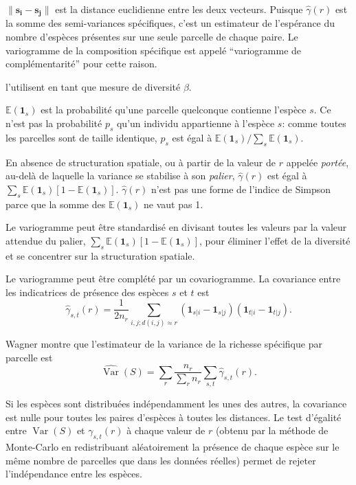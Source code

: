 \documentclass[
  11pt,
  french,
  a4paper,
  extrafontsizes,onecolumn,openright
  ]{memoir}
\begin{document}
\(\|\mathbf{s_i}-\mathbf{s_j}\|\) est la distance euclidienne entre les deux vecteurs.
Puisque \(\hat{\gamma}(r)\) est la somme des semi-variances spécifiques, c'est un estimateur de l'espérance du nombre d'espèces présentes sur une seule parcelle de chaque paire.
Le variogramme de la composition spécifique est appelé ``variogramme de complémentarité'' pour cette raison.

\textcite{Bacaro2007a} l'utilisent en tant que mesure de diversité \(\beta\).

\({\mathbb E}({\mathbf 1}_{s})\) est la probabilité qu'une parcelle quelconque contienne l'espèce \(s\).
Ce n'est pas la probabilité \(p_s\) qu'un individu appartienne à l'espèce \(s\):
comme toutes les parcelles sont de taille identique, \(p_s\) est égal à \({{\mathbb E}({\mathbf 1}_{s})}/{\sum_s{{\mathbb E}({\mathbf 1}_{s})}}\).

En absence de structuration spatiale, ou à partir de la valeur de \(r\) appelée \emph{portée}, au-delà de laquelle la variance se stabilise à son \emph{palier}, \(\hat{\gamma}(r)\) est égal à \(\sum_s{{\mathbb E}({\mathbf 1}_{s})[1-{\mathbb E}({\mathbf 1}_{s})]}\).
\(\hat{\gamma}(r)\) n'est pas une forme de l'indice de Simpson parce que la somme des \({\mathbb E}({\mathbf 1}_{s})\) ne vaut pas 1.

Le variogramme peut être standardisé en divisant toutes les valeurs par la valeur attendue du palier, \(\sum_s{{\mathbb E}({\mathbf 1}_{s})[1-{\mathbb E}({\mathbf 1}_{s})]}\), pour éliminer l'effet de la diversité et se concentrer sur la structuration spatiale.

Le variogramme peut être complété par un covariogramme.
La covariance entre les indicatrices de présence des espèces \(s\) et \(t\) est
\begin{equation}
  \label{eq:Estgammast}
  \hat{\gamma}_{s,t}(r) = \frac{1}{2 n_r} \sum_{i,j;d(i,j)\approx r}{({\mathbf 1}_{s|i} - {\mathbf 1}_{s|j})({\mathbf 1}_{t|i} - {\mathbf 1}_{t|j})}.
\end{equation}

Wagner montre que l'estimateur de la variance de la richesse spécifique par parcelle est
\begin{equation}
  \label{eq:VarS}
  \hat{\operatorname{Var}}(S) = \sum_r{\frac{n_r}{\sum_r{n_r}}} \sum_{s,t}{\hat{\gamma}_{s,t}(r)}.
\end{equation}

Si les espèces sont distribuées indépendamment les unes des autres, la covariance est nulle pour toutes les paires d'espèces à toutes les distances.
Le test d'égalité entre \(\operatorname{Var}(S)\) et \(\gamma_{s,t}(r)\) à chaque valeur de \(r\) (obtenu par la méthode de Monte-Carlo en redistribuant aléatoirement la présence de chaque espèce sur le même nombre de parcelles que dans les données réelles) permet de rejeter l'indépendance entre les espèces.
\end{document}

